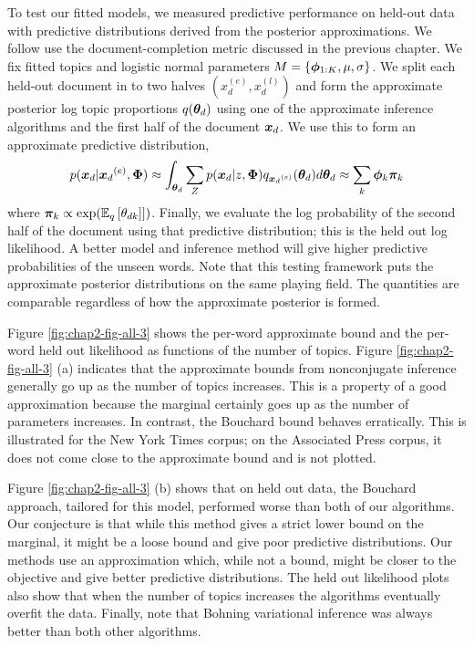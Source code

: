 To test our fitted models, we measured predictive performance on held-out data with predictive distributions derived from the posterior approximations. We follow use the document-completion metric\cite{Asuncion2012} discussed in the previous chapter. We fix fitted topics and logistic normal parameters $M = 
\{\param_{1:K},\mu,\sigma\}$. We split each held-out document in to two halves $(x_d^{(e)},x_d^{(l)})$ and form the approximate posterior log topic proportions $q(\thd)$ using one of the approximate inference algorithms and the first half of the document $\xdoc$. We use this to form an approximate predictive distribution,
\begin{align}
p(\xdoc|\xdoc^{(e)}, \params) 
\approx 
\int_\thd \sum_Z p(\xdoc|z,\params)q_{\xdoc^{(e)}}(\thd) d\thd 
\approx 
\sum_k \param_k \vv{\pi}_k
\end{align}
where $\vv{\pi}_k \propto \exp(\ex{\theta_{dk}}{q}])$. Finally, we evaluate the log probability of the second half of the document using that predictive distribution; this is the held out log likelihood. A better model and inference method will give higher predictive probabilities of the unseen words. Note that this testing framework puts the approximate posterior distributions on the same playing field. The quantities are comparable regardless of how the approximate posterior is formed.

Figure \ref{fig:chap2-fig-all-3} shows the per-word approximate bound and the per-word held out likelihood as functions of the number of topics. Figure \ref{fig:chap2-fig-all-3} (a) indicates that the approximate bounds from nonconjugate inference generally go up as the number of topics increases. This is a property of a good approximation because the marginal certainly goes up as the number of parameters increases. In contrast, the Bouchard bound behaves erratically. This is illustrated for the New York Times corpus; on the Associated Press corpus, it does not come close to the approximate bound and is not plotted.

Figure \ref{fig:chap2-fig-all-3} (b) shows that on held out data, the Bouchard approach, tailored for this model, performed worse than both of our algorithms. Our conjecture is that while this method gives a strict lower bound on the marginal, it might be a loose bound and give poor predictive distributions. Our methods use an approximation which, while not a bound, might be closer to the objective and give better predictive distributions. The held out likelihood plots also show that when the number of topics increases the algorithms eventually overfit the data. Finally, note that Bohning variational inference was always better than both other algorithms.

